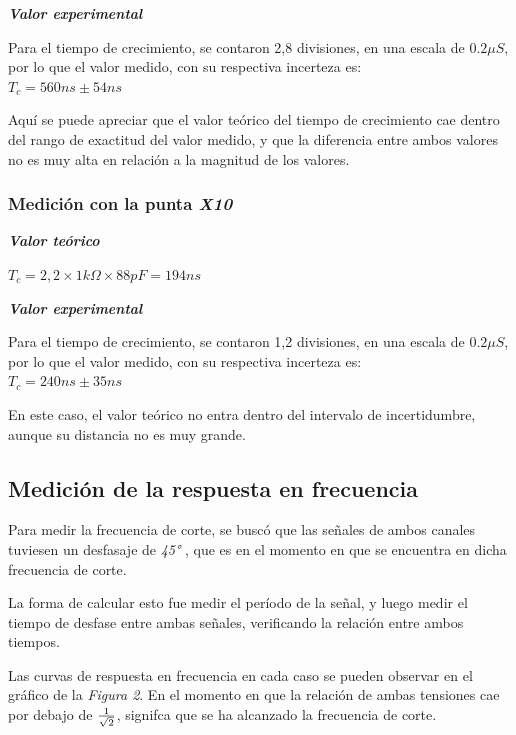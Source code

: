 \documentclass{article}
\begin{document}
\medskip	
	
\textbf{\textit{Valor experimental}}
\medskip

	Para el tiempo de crecimiento, se contaron 2,8 divisiones, en una escala de $0.2 \mu S$, por lo que el valor medido, con su respectiva incerteza es: \\

$T_c = 560 ns \pm 54 ns$\\
\smallskip

Aquí se puede apreciar que el valor teórico del tiempo de crecimiento cae dentro del rango de exactitud del valor medido, y que la diferencia entre ambos valores no es muy alta en relación a la magnitud de los valores.
\bigskip\bigskip


\subsubsection{Medición con la punta \textit{X10}} 
\medskip

\textbf{\textit{Valor teórico}}
\medskip

$T_c = 2,2 \times 1k\Omega \times 88pF =  194 ns$\\

\medskip

\textbf{\textit{Valor experimental}}

\medskip

	Para el tiempo de crecimiento, se contaron 1,2 divisiones, en una escala de $0.2 \mu S$, por lo que el valor medido, con su respectiva incerteza es: \\

$T_c = 240 ns \pm 35 ns$\\
\smallskip

En este caso, el valor teórico no entra dentro del intervalo de incertidumbre, aunque su distancia no es muy grande. 
\newpage



\subsection{Medición de la respuesta en frecuencia}
	
	Para medir la frecuencia de corte, se buscó que las señales de ambos canales tuviesen un desfasaje de \textit{45°} , que es en el momento en que se encuentra en dicha frecuencia de corte.
	\par
	La forma de calcular esto fue medir el período de la señal, y luego medir el tiempo de desfase entre ambas señales, verificando la relación entre ambos tiempos.
	\par
	Las curvas de respuesta en frecuencia en cada caso se pueden observar en el gráfico de la \textit{Figura 2}. En el momento en que la relación de ambas tensiones cae por debajo de ${1 \over \sqrt{2}}$, signifca que se ha alcanzado la frecuencia de corte.
\bigskip\bigskip
\end{document}
